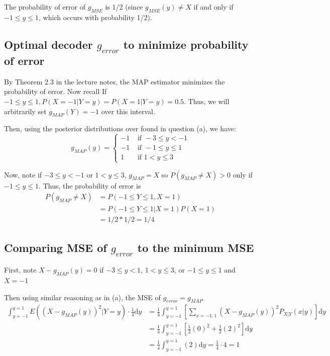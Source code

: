 \documentclass[paper=a4, fontsize=11pt]{scrartcl} %
\numberwithin{equation}{section} %
\numberwithin{figure}{section} %
\numberwithin{table}{section} %
\begin{document}
The probability of error of $g_{MSE}$ is 1/2 (since $g_{MSE}(y) \ne X$ if and only if $ -1 \leq y \leq 1$, which occurs with probability 1/2).

\subsection{Optimal decoder $g_{error}$ to minimize probability of error}

By Theorem 2.3 in the lecture notes, the MAP estimator minimizes the probability of error. Now recall
If $-1 \leq y \leq 1, P(X = -1 | Y = y) = P(X = 1 | Y = y) = 0.5$. Thus, we will arbitrarily set $g_{MAP}(Y) = -1$ over this interval.

Then, using the posterior distributions over found in question (a), we have:
\[
g_{MAP}(y) =
\begin{cases}
   -1 & \textrm{ if } -3 \leq y < -1 \\
   -1 & \textrm{ if } -1 \leq y \leq 1\\
    1 & \textrm{ if } 1 < y \leq 3
\end{cases}
\]

Now, note if $-3 \leq y < -1$ or $1 < y \leq 3$, $g_{MAP} = X$ so $P(g_{MAP} \ne X) > 0$ only if $-1 \leq y \leq 1$.  Thus, the probability of error is
\begin{align*}
P(g_{MAP} \ne X) &= P(-1 \leq Y \leq 1, X = 1) \\
   &= P(-1 \leq Y \leq 1 | X = 1)P(X = 1) \\
   &= 1/2 * 1/2 = 1/4
\end{align*}

\subsection{Comparing MSE of $g_{error}$ to the minimum MSE}

First, note $X - g_{MAP}(y) = 0$ if $-3 \leq y < 1$, $1 < y \leq 3$, or $-1 \leq y \leq 1$ and $X = -1$

Then using similar reasoning as in (a), the MSE of $g_{error} = g_{MAP}$
\begin{align*}
\int_{y = -1}^{y = 1} E((X - g_{MAP}(y))^2 | Y = y) \cdot \frac{1}{4} \textrm{d}y &=  \frac{1}{4} \int_{y = -1}^{y = 1}\left[ \sum_{x = -1, 1} (X - g_{MAP}(y))^2 P_{X|Y}(x | y) \right] \textrm{d}y \\
   &=  \frac{1}{4} \int_{y = -1}^{y = 1}\left[\frac{1}{2} (0)^2 + \frac{1}{2} (2)^2\right] \textrm{d}y \\
   &=  \frac{1}{4} \int_{y = -1}^{y = 1}(2) \textrm{d}y = \frac{1}{4} \cdot 4 = 1
\end{align*}
\end{document}

